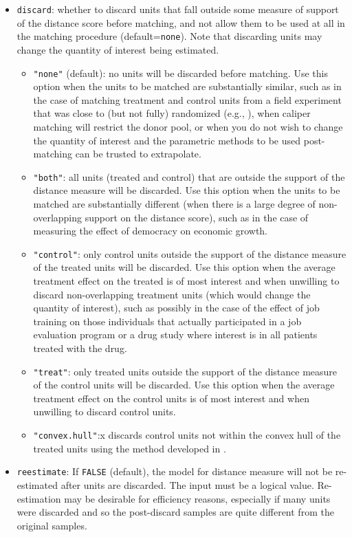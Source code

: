 \begin{itemize}
\item \texttt{discard}: whether to discard units that fall outside
  some measure of support of the distance score before matching, and
  not allow them to be used at all in the matching procedure
  (default=\texttt{none}).  Note that discarding units may change the
  quantity of interest being estimated.
  \begin{itemize}
  \item \texttt{"none"} (default): no units will be discarded before
    matching.  Use this option when the units to be matched are
    substantially similar, such as in the case of matching treatment
    and control units from a field experiment that was close to (but
    not fully) randomized (e.g., \citealt{Imai05}), when caliper
    matching will restrict the donor pool, or when you do not wish to
    change the quantity of interest and the parametric methods to be
    used post-matching can be trusted to extrapolate.
  \item \texttt{"both"}: all units (treated and control) that are
    outside the support of the distance measure will be discarded. Use
    this option when the units to be matched are substantially
    different (when there is a large degree of non-overlapping support
    on the distance score), such as in the case of measuring the
    effect of democracy on economic growth.
  \item \texttt{"control"}: only control units outside the support of
    the distance measure of the treated units will be discarded.  Use
    this option when the average treatment effect on the treated is of
    most interest and when unwilling to discard non-overlapping
    treatment units (which would change the quantity of interest),
    such as possibly in the case of the effect of job training on
    those individuals that actually participated in a job evaluation
    program or a drug study where interest is in all patients treated
    with the drug.
  \item \texttt{"treat"}: only treated units outside the support of
    the distance measure of the control units will be discarded.  Use
    this option when the average treatment effect on the control units
    is of most interest and when unwilling to discard control units.
  \item \texttt{"convex.hull"}:x discards control units not within the
    convex hull of the treated units using the method developed in
    \citep{KinZen05b}.
  \end{itemize}
  
\item \texttt{reestimate}: If {\tt FALSE} (default), the model for
  distance measure will not be re-estimated after units are discarded.
  The input must be a logical value.  Re-estimation may be desirable
  for efficiency reasons, especially if many units were discarded and
  so the post-discard samples are quite different from the original
  samples.
  
\end{itemize}


